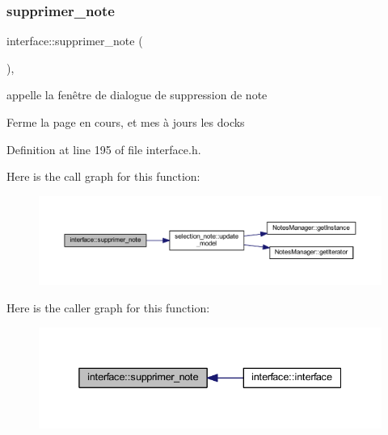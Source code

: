 \subsubsection{\texorpdfstring{supprimer\+\_\+note}{supprimer\_note}}
{\footnotesize\ttfamily interface\+::supprimer\+\_\+note (\begin{DoxyParamCaption}{ }\end{DoxyParamCaption})\hspace{0.3cm}{\ttfamily [inline]}, {\ttfamily [slot]}}



appelle la fenêtre de dialogue de suppression de note 

Ferme la page en cours, et mes à jours les docks 

Definition at line 195 of file interface.\+h.

Here is the call graph for this function\+:\nopagebreak
\begin{figure}[H]
\begin{center}
\leavevmode
\includegraphics[width=350pt]{classinterface_aca23c755ba40ca8198010ff0487b22a8_cgraph}
\end{center}
\end{figure}
Here is the caller graph for this function\+:\nopagebreak
\begin{figure}[H]
\begin{center}
\leavevmode
\includegraphics[width=338pt]{classinterface_aca23c755ba40ca8198010ff0487b22a8_icgraph}
\end{center}
\end{figure}
\mbox{\label{classinterface_a430ee153cb2ea74b9103081d48cd61f3}} 
